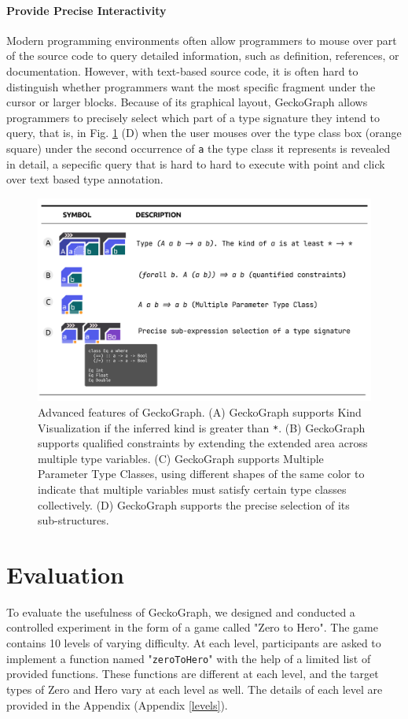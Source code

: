 \documentclass[preprint,12pt]{elsarticle}
\begin{document}
\paragraph{Provide Precise Interactivity}
Modern programming environments often allow programmers to mouse over part of the source code to query detailed information, such as definition, references, or documentation. However, with text-based source code, it is often hard to distinguish whether programmers want the most specific fragment under the cursor or larger blocks. Because of its graphical layout, GeckoGraph allows programmers to precisely select which part of a type signature they intend to query, that is, in Fig. \ref{fig:advanced} (D) when the user mouses over the type class box (orange square) under the second occurrence of \texttt{a} the type class it represents is revealed in detail, a sepecific query that is hard to hard to execute with point and click over text based type annotation.

\begin{figure}[h]
\label{fig:advanced}
  \includegraphics[width=\linewidth]{figures/Advanced}
  \caption{
  \label{fig:advanced}
  Advanced features of GeckoGraph. (A) GeckoGraph supports Kind Visualization if the inferred kind is greater than \texttt{*}. (B) GeckoGraph supports qualified constraints by extending the extended area across multiple type variables. (C) GeckoGraph supports Multiple Parameter Type Classes, using different shapes of the same color to indicate that multiple variables must satisfy certain type classes collectively. (D) GeckoGraph supports the precise selection of its sub-structures. }
\end{figure}


\section{Evaluation} \label{sec:evaluation}
To evaluate the usefulness of GeckoGraph, we designed and conducted a controlled experiment in the form of a game called "Zero to Hero". The game contains 10 levels of varying difficulty. At each level, participants are asked to implement a function named "\texttt{zeroToHero}" with the help of a limited list of provided functions. These functions are different at each level, and the target types of Zero and Hero vary at each level as well. The details of each level are provided in the Appendix (Appendix \ref{levels}). 
\end{document}
